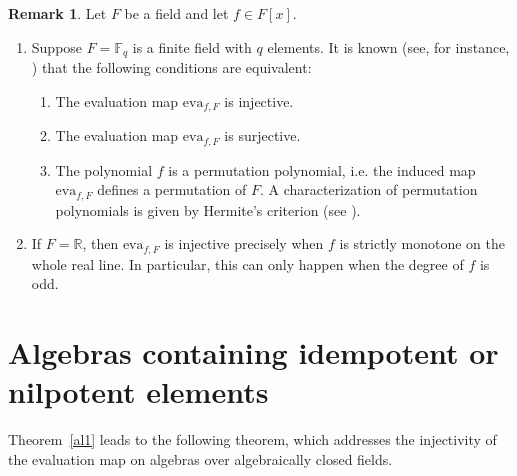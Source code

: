 \documentclass{amsart}
\theoremstyle{definition}
\newtheorem{remark}[theorem]{Remark}%
\begin{document}
	
	\begin{remark}\label{remark1}
		Let $F$ be a field and let $f \in F[x]$. 
		\begin{enumerate}[\rm (i)]
			\item Suppose $F = \mathbb{F}_q$ is a finite field with $q$ elements. It is  known (see, for instance, \cite[7.1 Lemma, p.~348]{Bo_Li_97}) that the following conditions are equivalent:
			\begin{enumerate}[\rm (a)]
				\item The evaluation map $\mathrm{eva}_{f,F}$ is injective. 
				\item The evaluation map $\mathrm{eva}_{f,F}$ is surjective.
				\item The polynomial $f$ is a permutation polynomial, i.e. the induced map $\mathrm{eva}_{f,F}$ defines a permutation of $F$. 
				A characterization of permutation polynomials is given by Hermite’s criterion (see \cite[7.4 Theorem]{Bo_Li_97}).
			\end{enumerate}
			
			\item If $F = \mathbb{R}$, then $\mathrm{eva}_{f,F}$ is injective precisely when $f$ is strictly monotone on the whole real line. 
			In particular, this can only happen when the degree of $f$ is odd.
		\end{enumerate}
	\end{remark}
	
	
	
	\section{Algebras containing idempotent or nilpotent elements}\label{nilpotent}
	
	
	Theorem~\ref{al1} leads to the following theorem, which addresses the injectivity of the evaluation map on algebras over algebraically closed fields.
	
\end{document}

